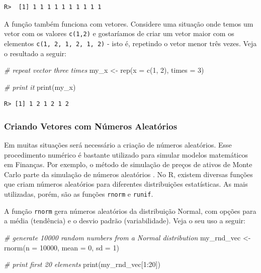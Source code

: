 \documentclass[
  11pt,
]{book}
\newenvironment{Shaded}{\begin{snugshade}}{\end{snugshade}}
\newcommand{\AttributeTok}[1]{\textcolor[rgb]{0.61,0.61,0.61}{#1}}
\newcommand{\CommentTok}[1]{\textcolor[rgb]{0.37,0.37,0.37}{\textit{#1}}}
\newcommand{\DecValTok}[1]{\textcolor[rgb]{0.06,0.06,0.06}{#1}}
\newcommand{\FunctionTok}[1]{\textcolor[rgb]{0,0,0}{#1}}
\newcommand{\NormalTok}[1]{#1}
\newcommand{\OtherTok}[1]{\textcolor[rgb]{0.37,0.37,0.37}{#1}}
\newcommand{\SpecialCharTok}[1]{\textcolor[rgb]{0,0,0}{#1}}
\begin{document}
\begin{verbatim}
R>  [1] 1 1 1 1 1 1 1 1 1 1
\end{verbatim}

A função também funciona com vetores. Considere uma situação onde temos um vetor com os valores \texttt{c(1,2)} e gostaríamos de criar um vetor maior com os elementos \texttt{c(1,\ 2,\ 1,\ 2,\ 1,\ 2)} - isto é, repetindo o vetor menor três vezes. Veja o resultado a seguir:

\begin{Shaded}
\begin{Highlighting}[]
\CommentTok{\# repeat vector three times}
\NormalTok{my\_x }\OtherTok{\textless{}{-}} \FunctionTok{rep}\NormalTok{(}\AttributeTok{x =} \FunctionTok{c}\NormalTok{(}\DecValTok{1}\NormalTok{, }\DecValTok{2}\NormalTok{), }\AttributeTok{times =} \DecValTok{3}\NormalTok{)}

\CommentTok{\# print it}
\FunctionTok{print}\NormalTok{(my\_x)}
\end{Highlighting}
\end{Shaded}

\begin{verbatim}
R> [1] 1 2 1 2 1 2
\end{verbatim}

\hypertarget{criando-vetores-com-nuxfameros-aleatuxf3rios}{%
\subsubsection{Criando Vetores com Números Aleatórios}\label{criando-vetores-com-nuxfameros-aleatuxf3rios}}

Em muitas situações será necessário a criação de números aleatórios. Esse procedimento numérico é bastante utilizado para simular modelos matemáticos em Finanças. Por exemplo, o método de simulação de preços de ativos de Monte Carlo parte da simulação de números aleatórios \citep{mcleish2011monte}. No R, existem diversas funções que criam números aleatórios para diferentes distribuições estatísticas. As mais utilizadas, porém, são as funções \texttt{rnorm} e \texttt{runif}.  

A função \texttt{rnorm} gera números aleatórios da distribuição Normal, com opções para a média (tendência) e o desvio padrão (variabilidade). Veja o seu uso a seguir:

\begin{Shaded}
\begin{Highlighting}[]
\CommentTok{\# generate 10000 random numbers from a Normal distribution}
\NormalTok{my\_rnd\_vec }\OtherTok{\textless{}{-}} \FunctionTok{rnorm}\NormalTok{(}\AttributeTok{n =} \DecValTok{10000}\NormalTok{,}
                    \AttributeTok{mean =} \DecValTok{0}\NormalTok{,}
                    \AttributeTok{sd =} \DecValTok{1}\NormalTok{)}

\CommentTok{\# print first 20 elements}
\FunctionTok{print}\NormalTok{(my\_rnd\_vec[}\DecValTok{1}\SpecialCharTok{:}\DecValTok{20}\NormalTok{])}
\end{Highlighting}
\end{Shaded}
\end{document}
